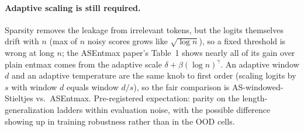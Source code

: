 \documentclass{article}
\begin{document}
\paragraph{Adaptive scaling is still required.} Sparsity removes the leakage from irrelevant tokens,
but the logits themselves drift with $n$ (max of $n$ noisy scores grows like $\sqrt{\log n}$), so a
fixed threshold is wrong at long $n$; the ASEntmax paper's Table~1 shows nearly all of its gain over
plain entmax comes from the adaptive scale $\delta + \beta(\log n)^{\gamma}$. An adaptive window $d$
and an adaptive temperature are the same knob to first order (scaling logits by $s$ with window $d$
equals window $d/s$), so the fair comparison is AS-windowed-Stieltjes vs.\ ASEntmax. Pre-registered
expectation: parity on the length-generalization ladders within evaluation noise, with the possible
difference showing up in training robustness rather than in the OOD cells.
\end{document}
